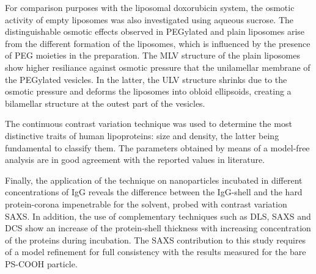 For comparison purposes with the liposomal doxorubicin system, the osmotic activity of empty liposomes was also investigated using aqueous sucrose. The distinguishable osmotic effects observed in PEGylated and plain liposomes arise from the different formation of the liposomes, which is influenced by the presence of PEG moieties in the preparation. The MLV structure of the plain liposomes show higher resiliance against osmotic pressure that the unilamellar membrane of the PEGylated vesicles. In the latter, the ULV structure shrinks due to the osmotic pressure and deforms the liposomes into obloid ellipsoids, creating a bilamellar structure at the outest part of the vesicles.

The continuous contrast variation technique was used to determine the most distinctive traits of human lipoproteins: size and density, the latter being fundamental to classify them. The parameters obtained by means of a model-free analysis are in good agreement with the reported values in literature.

Finally, the application of the technique on nanoparticles incubated in different concentrations of IgG reveals the difference between the IgG-shell and the hard protein-corona impenetrable for the solvent, probed with contrast variation SAXS. In addition, the use of complementary techniques such as DLS, SAXS and DCS show an increase of the protein-shell thickness with increasing concentration of the proteins during incubation. The SAXS contribution to this study requires of a model refinement for full consistency with the results measured for the bare PS-COOH particle.
